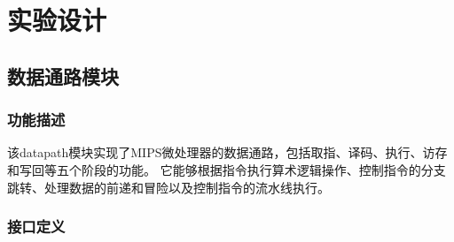 \section{实验设计}
\subsection{数据通路模块}\label{sub:Datapath}
\subsubsection{功能描述}
该datapath模块实现了MIPS微处理器的数据通路，包括取指、译码、执行、访存和写回等五个阶段的功能。
它能够根据指令执行算术逻辑操作、控制指令的分支跳转、处理数据的前递和冒险以及控制指令的流水线执行。
\subsubsection{接口定义}
